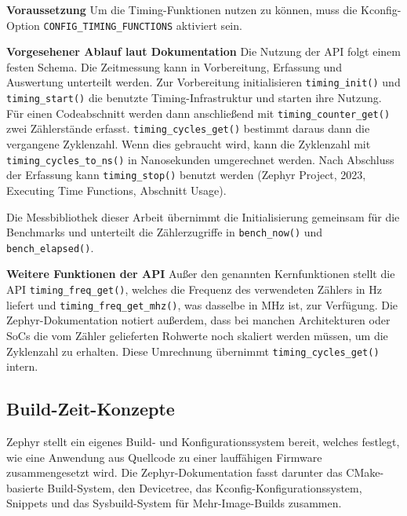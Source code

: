 \textbf{Voraussetzung} Um die Timing-Funktionen nutzen zu k{\"o}nnen, muss die Kconfig-Option \lstinline[style=codeinline]|CONFIG_TIMING_FUNCTIONS| aktiviert sein.

\textbf{Vorgesehener Ablauf laut Dokumentation} Die Nutzung der API folgt einem festen Schema. Die Zeitmessung kann in Vorbereitung, Erfassung und Auswertung unterteilt werden. Zur Vorbereitung initialisieren \lstinline[style=codeinline]|timing_init()| und \lstinline[style=codeinline]|timing_start()| die benutzte Timing-Infrastruktur und starten ihre Nutzung. F{\"u}r einen Codeabschnitt werden dann anschlie{\ss}end mit \lstinline[style=codeinline]|timing_counter_get()| zwei Z{\"a}hlerst{\"a}nde erfasst. \lstinline[style=codeinline]|timing_cycles_get()| bestimmt daraus dann die vergangene Zyklenzahl. Wenn dies gebraucht wird, kann die Zyklenzahl mit \lstinline[style=codeinline]|timing_cycles_to_ns()| in Nanosekunden umgerechnet werden. Nach Abschluss der Erfassung kann \lstinline[style=codeinline]|timing_stop()| benutzt werden (Zephyr Project, 2023, \glqq{}Executing Time Functions\grqq{}, Abschnitt \glqq{}Usage\grqq{}).

Die Messbibliothek dieser Arbeit {\"u}bernimmt die Initialisierung gemeinsam f{\"u}r die Benchmarks und unterteilt die Z{\"a}hlerzugriffe in \lstinline[style=codeinline]|bench_now()| und \lstinline[style=codeinline]|bench_elapsed()|.

\textbf{Weitere Funktionen der API} Au{\ss}er den genannten Kernfunktionen stellt die API \lstinline[style=codeinline]|timing_freq_get()|, welches die Frequenz des verwendeten Z{\"a}hlers in Hz liefert und \lstinline[style=codeinline]|timing_freq_get_mhz()|, was dasselbe in MHz ist, zur Verf{\"u}gung. Die Zephyr-Dokumentation notiert au{\ss}erdem, dass bei manchen Architekturen oder SoCs die vom Z{\"a}hler gelieferten Rohwerte noch skaliert werden m{\"u}ssen, um die Zyklenzahl zu erhalten. Diese Umrechnung {\"u}bernimmt \lstinline[style=codeinline]|timing_cycles_get()| intern.

\subsection{Build-Zeit-Konzepte}
Zephyr stellt ein eigenes Build- und Konfigurationssystem bereit, welches festlegt, wie eine Anwendung aus Quellcode zu einer lauff{\"a}higen Firmware zusammengesetzt wird. Die Zephyr-Dokumentation fasst darunter das CMake-basierte Build-System, den Devicetree, das Kconfig-Konfigurationssystem, Snippets und das Sysbuild-System f{\"u}r Mehr-Image-Builds zusammen.

